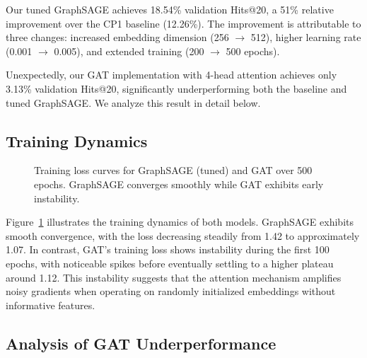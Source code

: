 \documentclass{article}
\begin{document}
Our tuned GraphSAGE achieves 18.54\% validation Hits@20, a 51\% relative improvement over the CP1 baseline (12.26\%). The improvement is attributable to three changes: increased embedding dimension (256 $\rightarrow$ 512), higher learning rate (0.001 $\rightarrow$ 0.005), and extended training (200 $\rightarrow$ 500 epochs).

Unexpectedly, our GAT implementation with 4-head attention achieves only 3.13\% validation Hits@20, significantly underperforming both the baseline and tuned GraphSAGE. We analyze this result in detail below.

\subsection{Training Dynamics}

\begin{figure}[h]
\centering
{}
\caption{Training loss curves for GraphSAGE (tuned) and GAT over 500 epochs. GraphSAGE converges smoothly while GAT exhibits early instability.}
\label{fig:loss}
\end{figure}

Figure~\ref{fig:loss} illustrates the training dynamics of both models. GraphSAGE exhibits smooth convergence, with the loss decreasing steadily from 1.42 to approximately 1.07. In contrast, GAT's training loss shows instability during the first 100 epochs, with noticeable spikes before eventually settling to a higher plateau around 1.12. This instability suggests that the attention mechanism amplifies noisy gradients when operating on randomly initialized embeddings without informative features.

\subsection{Analysis of GAT Underperformance}
\end{document}
